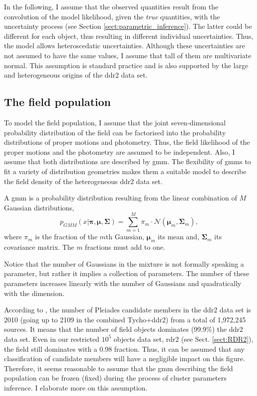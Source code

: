 In the following, I assume that the observed quantities result from the convolution of the model likelihood, given the \emph{true} quantities, with the uncertainty process (see Section \ref{sect:parametric_inference}). The latter could be different for each object, thus resulting in different individual uncertainties. Thus, the model allows heteroscedatic uncertainties. Although these uncertainties are not assumed to have the same values, I assume that tall of them are multivariate normal.  This assumption is standard practice and is also supported by the large and heterogeneous origins of the \gls{ddr2} data set. 

\subsection{The field population}
\label{sect:field_population}
To model the field population, I assume that the joint seven-dimensional probability distribution of the field can be factorised into the probability distributions of proper motions and photometry. Thus, the field likelihood of the proper motions and the photometry are assumed to be independent. Also, I assume that both distributions are described by \gls{gmm}. The flexibility of \glspl{gmm} to fit a variety of distribution geometries makes them a suitable model to describe the field density of the heterogeneous \gls{ddr2} data set. 

A \gls{gmm} is a probability distribution resulting from the linear combination of $M$ Gaussian distributions, 
\begin{equation}
p_{GMM}(x|\boldsymbol{\pi},\boldsymbol{\mu},\boldsymbol{\Sigma})=\sum_{m=1}^M \pi_m \cdot \mathcal{N}(\boldsymbol{\mu}_m,\boldsymbol{\Sigma}_m),
\end{equation}
{where $\pi_m$ is the fraction of the $m$th Gaussian, $\boldsymbol{\mu}_m$ its mean and, $\boldsymbol{\Sigma}_m$ its covariance matrix. The $m$ fractions must add to one. }

{Notice that the number of Gaussians in the mixture is not formally speaking a parameter, but rather it implies a collection of parameters. The number of these parameters increases linearly with the number of Gaussians and quadratically with the dimension.} 

According to \citet{Bouy2015}, the number of Pleiades candidate members in the \gls{ddr2} data set is 2010 (going up to 2109 in the combined Tycho+\gls{ddr2}) from a total of 1,972,245 sources. It means that the number of field objects dominates (99.9\%) the \gls{ddr2} data set. Even in our restricted $10^5$ objects data set, \gls{rdr2} (see Sect. \ref{sect:RDR2}), the field still dominates with a 0.98 fraction. Thus, it can be assumed that any classification of candidate members will have a negligible impact on this figure. Therefore, it seems reasonable to assume that the \gls{gmm} describing the field population can be frozen (fixed) during the process of cluster parameters inference. I elaborate more on this assumption.


